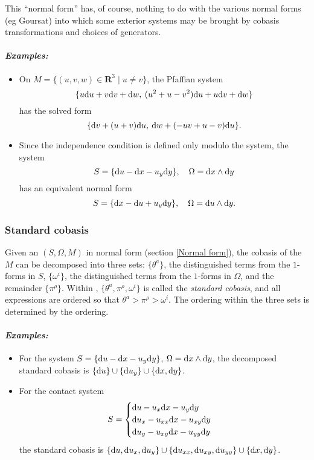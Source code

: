 This ``normal form'' has, of course, nothing to do with the various normal
forms (eg Goursat) into which some exterior systems may be brought by
cobasis transformations and choices of generators.

\paragraph{\textit{Examples:}}
\begin{itemize}
\item On $M=\{(u,v,w)\in{\mathbf{R}}^3\mid u\neq v\}$, the Pfaffian system
      \[\{u\mathrm{d} u + v\mathrm{d} v + \mathrm{d} w,\>(u^2 + u - v^2)\mathrm{d} u + u\mathrm{d} v + \mathrm{d} w\}\] has
      the solved form
      \[\{\mathrm{d} v + (u + v)\mathrm{d} u,\>\mathrm{d} w + ( - uv + u - v )\mathrm{d} u\}.\]
\item Since the independence condition is defined only modulo the system,
      the system
      \[S=\{\mathrm{d} u - \mathrm{d} x - u_y\mathrm{d} y\},\quad \Omega=\mathrm{d} x\wedge\mathrm{d} y\] has an
      equivalent normal form
      \[S=\{\mathrm{d} x - \mathrm{d} u + u_y\mathrm{d} y\},\quad \Omega=\mathrm{d} u\wedge\mathrm{d} y.\]
\end{itemize}

\subsubsection{Standard cobasis}
\label{Standard cobasis}

Given an  $(S,\Omega,M)$ in normal form (section \ref{Normal
form}), the cobasis of the  $M$ can be decomposed into three
sets: $\{\theta^a\}$, the distinguished terms from the $1$-forms in $S$,
$\{\omega^i\}$, the distinguished terms from the $1$-forms in $\Omega$, and
the remainder $\{\pi^\rho\}$. Within , $\{\theta^a,\pi^\rho,\omega^i\}$
is called the \emph{standard cobasis}, and all expressions are ordered so
that $\theta^a > \pi^\rho > \omega^i$. The ordering within the three sets
is determined by the \REDUCE {} ordering.

\paragraph{\textit{Examples:}}
\begin{itemize}
\item For the system $S=\{\mathrm{d} u - \mathrm{d} x - u_y\mathrm{d} y\}$, $\Omega=\mathrm{d} x\wedge\mathrm{d} y$,
      the decomposed standard cobasis is $\{\mathrm{d} u\}\cup\{\mathrm{d} u_y\}\cup\{\mathrm{d}
      x,\mathrm{d} y\}$.
\item For the contact system
  \[S=\begin{cases}
                \mathrm{d} u - u_x\mathrm{d} x - u_y\mathrm{d} y\\
                \mathrm{d} u_x - u_{xx}\mathrm{d} x - u_{xy}\mathrm{d} y\\
                \mathrm{d} u_y - u_{xy}\mathrm{d} x - u_{yy}\mathrm{d} y
       \end{cases}\]
      the standard cobasis is $\{\mathrm{d} u,\mathrm{d} u_x,\mathrm{d} u_y\}\cup\{\mathrm{d}
      u_{xx},\mathrm{d} u_{xy},\mathrm{d} u_{yy}\}\cup\{\mathrm{d} x,\mathrm{d} y\}$.

\end{itemize}


